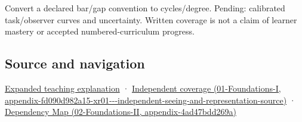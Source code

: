 Convert a declared bar/gap convention to cycles/degree. Pending: calibrated task/observer curves and uncertainty. Written coverage is not a claim of learner mastery or accepted numbered-curriculum progress.

\subsection{Source and navigation}\label{appendix-b491fc48c54b-source-and-navigation}

\hyperref[04-visual-computing-ii-ch042-visibility-is-about-contrast-conditions-and-tasks]{Expanded teaching explanation} · \href{../01-Foundations-I/main.pdf\#nameddest=appendix-fd090d982a15-xr01---independent-seeing-and-representation-source}{Independent coverage (01-Foundations-I, appendix-fd090d982a15-xr01-\/-\/-independent-seeing-and-representation-source)} · \href{../02-Foundations-II/main.pdf\#nameddest=appendix-4ad47bdd269a}{Dependency Map (02-Foundations-II, appendix-4ad47bdd269a)}
